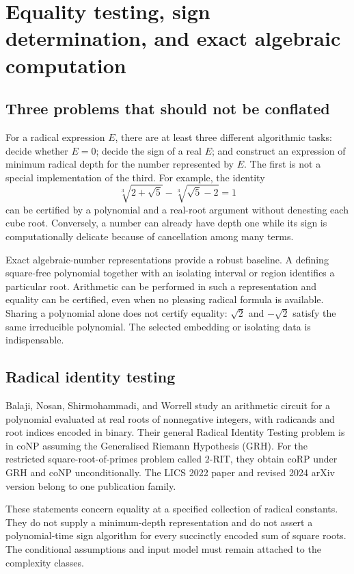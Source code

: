 \documentclass[11pt,a4paper]{article}
\newcommand{\cbrt}[1]{\sqrt[3]{#1}}
\theoremstyle{definition}
\theoremstyle{remark}
\numberwithin{equation}{section}
\begin{document}
\section{Equality testing, sign determination, and exact algebraic computation}
\label{sec:equality}

\subsection{Three problems that should not be conflated}

For a radical expression $E$, there are at least three different algorithmic tasks: decide whether $E=0$; decide the sign of a real $E$; and construct an expression of minimum radical depth for the number represented by $E$. The first is not a special implementation of the third. For example, the identity
\[
 \cbrt{2+\sqrt5}-\cbrt{\sqrt5-2}=1
\]
can be certified by a polynomial and a real-root argument without denesting each cube root. Conversely, a number can already have depth one while its sign is computationally delicate because of cancellation among many terms.\cite{blomer1991,blomerzero,rit,gaillard,allender}

Exact algebraic-number representations provide a robust baseline. A defining square-free polynomial together with an isolating interval or region identifies a particular root. Arithmetic can be performed in such a representation and equality can be certified, even when no pleasing radical formula is available. Sharing a polynomial alone does not certify equality: $\sqrt2$ and $-\sqrt2$ satisfy the same irreducible polynomial. The selected embedding or isolating data is indispensable.\cite{cohen,cox,sageqqbar,wolframroot}

\subsection{Radical identity testing}

Balaji, Nosan, Shirmohammadi, and Worrell study an arithmetic circuit for a polynomial evaluated at real roots of nonnegative integers, with radicands and root indices encoded in binary. Their general Radical Identity Testing problem is in coNP assuming the Generalised Riemann Hypothesis (GRH). For the restricted square-root-of-primes problem called $2$-RIT, they obtain coRP under GRH and coNP unconditionally. The LICS 2022 paper and revised 2024 arXiv version belong to one publication family.\cite{rit}

These statements concern equality at a specified collection of radical constants. They do not supply a minimum-depth representation and do not assert a polynomial-time sign algorithm for every succinctly encoded sum of square roots. The conditional assumptions and input model must remain attached to the complexity classes.
\end{document}
